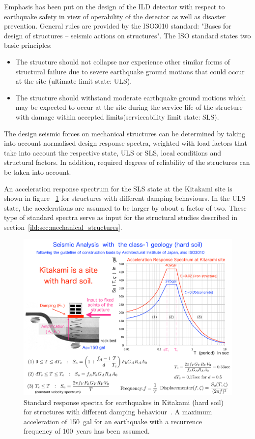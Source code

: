 Emphasis has been put on the design of the ILD detector with respect to earthquake safety in view of operability of the detector as well as disaster prevention. General rules are provided by the ISO3010 standard: "Bases for design of structures -- seismic actions on structures". The ISO standard states two basic principles:
\begin{itemize}
\item The structure should not collapse nor experience other similar forms of structural failure due to severe earthquake ground motions that could occur at the site (ultimate limit state: ULS).
\item The structure should withstand moderate earthquake ground motions which may be expected to occur at the site during the service life of the structure with damage within accepted limits(serviceability limit state: SLS).
\end{itemize}

The design seismic forces on mechanical structures can be determined by taking into account normalised design response spectra, weighted with load factors that take into account the respective state, ULS or SLS, local conditions and structural factors. In addition, required degrees of reliability of the structures can be taken into account.

An acceleration response spectrum for the SLS state at the Kitakami site is shown in figure~ \ref{ild:fig:integration:earthquake_spectra} for structures with different damping behaviours. In the ULS state, the accelerations are assumed to be larger by about a factor of two. These type of standard spectra serve as input for the structural studies described in section~\ref{ild:sec:mechanical_structures}.
\begin{figure}[t!]
\includegraphics[width=0.8\hsize]{Integration/fig/earthquake_spectra.pdf}
\caption{\label{ild:fig:integration:earthquake_spectra}Standard response spectra for earthquakes in Kitakami (hard soil) for structures with different damping behaviour~\cite{ild:bib:earthquake}. A maximum acceleration of 150~gal for an earthquake with a recurrence frequency of 100~years has been assumed.}
\end{figure}

